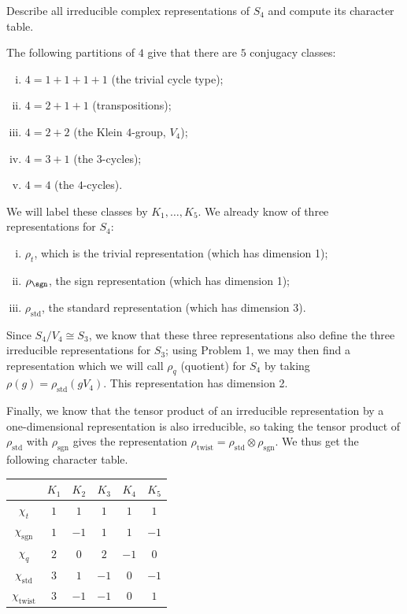 \documentclass[10pt]{mypackage}
\begin{document}
\begin{problem}[Problem 3]
  Describe all irreducible complex representations of $S_4$ and compute its character table.
\end{problem}
\begin{solution}
  The following partitions of $4$ give that there are $5$ conjugacy classes:
  \begin{enumerate}[(i)]
    \item $4 = 1 + 1 + 1 + 1$ (the trivial cycle type);
    \item $4 = 2 + 1 + 1$ (transpositions);
    \item $4 = 2 + 2$ (the Klein $4$-group, $V_4$);
    \item $4 = 3 + 1$ (the $3$-cycles);
    \item $4 = 4$ (the $4$-cycles).
  \end{enumerate}
  We will label these classes by $K_1,\dots,K_5$. We already know of three representations for $S_4$:
  \begin{enumerate}[(i)]
    \item $\rho_{t}$, which is the trivial representation (which has dimension 1);
    \item $\rho_{\sgn}$, the sign representation (which has dimension 1);
    \item $\rho_{\operatorname{std}}$, the standard representation (which has dimension 3).
  \end{enumerate}
  Since $S_4/V_4\cong S_3$, we know that these three representations also define the three irreducible representations for $S_3$; using Problem 1, we may then find a representation which we will call $\rho_{q}$ (quotient) for $S_4$ by taking $\rho(g) = \rho_{\operatorname{std}}\left(gV_4\right)$. This representation has dimension 2.

  Finally, we know that the tensor product of an irreducible representation by a one-dimensional representation is also irreducible, so taking the tensor product of $\rho_{\operatorname{std}}$ with $\rho_{\operatorname{sgn}}$ gives the representation $\rho_{\operatorname{twist}} = \rho_{\operatorname{std}}\otimes \rho_{\operatorname{sgn}}$. We thus get the following character table.
  \begin{center}
    \begin{tabular}{c|c|c|c|c|c}
      & $K_1$ & $K_2$ & $K_3$ & $K_4$ & $K_5$\\
      \hline
      $\chi_{t}$ & $ 1 $ & $1$ & $1$ & $1$ & $1$ \\
      $\chi_{\operatorname{sgn}}$ & $1$ & $-1$ & $1$ & $1$ & $-1$ \\
      $\chi_{q}$ & $2$ & $0$ & $2$ & $-1$ & $0$\\
      $\chi_{\operatorname{std}}$ & $3$ & $1$ & $-1$ & $ 0 $ & $-1$\\
      $\chi_{\operatorname{twist}}$ & $3$ & $-1$ & $-1$ & $0$ & $1$ \\
      \hline
    \end{tabular}
  \end{center}
\end{solution}
\end{document}
